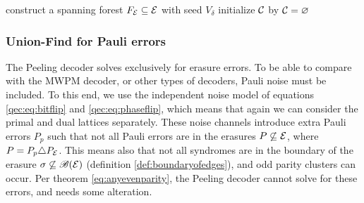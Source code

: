 \begin{algo}[algotitle=Peeling decoder for bounded surfaces (adapted from \cite{delfosse2017linear}), label=algo:peelbound]
  \begin{algorithm}[H]
    \BlankLine
    construct a spanning forest $F_{\mathcal{E}}\subseteq\mathcal{E}$ with seed $V_\delta$\;
    initialize $\mathcal{C}$ by $\mathcal{C} = {\varnothing}$\;
  \end{algorithm}
\end{algo}




\subsubsection{Union-Find for Pauli errors}
The Peeling decoder solves exclusively for erasure errors. To be able to compare with the MWPM decoder, or other types of decoders, Pauli noise must be included. To this end, we use the independent noise model of equations \ref{qec:eq:bitflip} and \ref{qec:eq:phaseflip}, which means that again we can consider the primal and dual lattices separately. These noise channels introduce extra Pauli errors $P_p$ such that not all Pauli errors are in the erasures $P\not\subseteq \mathcal{E}$, where $P = P_p\triangle P_{\mathcal{E}}$. This means also that not all syndromes are in the boundary of the erasure $\sigma \not\subseteq \mathscr{B}(\mathcal{E})$ (definition \ref{def:boundaryofedges}), and odd parity clusters can occur. Per theorem \ref{eq:anyevenparity}, the Peeling decoder cannot solve for these errors, and needs some alteration.

